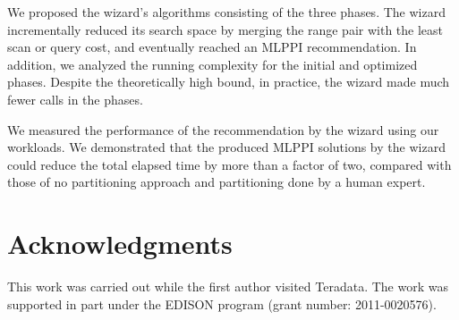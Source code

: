 \documentclass[paper]{ieice}
\begin{document}
We proposed the wizard's algorithms consisting of the three phases. 
The wizard \hbox{incrementally} reduced its search space by merging 
the range pair with the least scan or query cost, and eventually reached an MLPPI recommendation. 
In addition, we analyzed the running complexity for the initial and optimized phases. 
Despite the theoretically high bound, in practice, the wizard made much fewer calls in the phases.

We measured the performance of the recommendation by the wizard using 
our workloads.  
We demonstrated that the produced MLPPI solutions by 
the wizard could reduce the total elapsed time by more than a factor of two, 
compared with those of no partitioning approach and partitioning 
done by a human expert. 

\section*{Acknowledgments} 
This work was carried out while the first author visited Teradata. 
The work was supported in part under the EDISON program (grant number: 2011-0020576).
\end{document}

